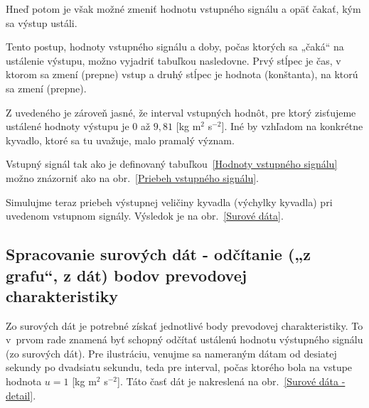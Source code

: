 \documentclass[a4paper, 10pt, ]{article}
\begin{document}
Hneď potom je však možné zmeniť hodnotu vstupného signálu a opäť čakať, kým sa výstup ustáli.

Tento postup, hodnoty vstupného signálu a doby, počas ktorých sa „čaká“ na ustálenie výstupu, možno vyjadriť tabuľkou nasledovne. Prvý stĺpec je čas, v ktorom sa zmení (prepne) vstup a druhý stĺpec je hodnota (konštanta), na ktorú sa zmení (prepne).


Z uvedeného je zároveň jasné, že interval vstupných hodnôt, pre ktorý zisťujeme ustálené hodnoty výstupu je $0$ až $9,81$ [kg m$^2$ s$^{-2}$]. Iné by vzhľadom na konkrétne kyvadlo, ktoré sa tu uvažuje, malo pramalý význam.

Vstupný signál tak ako je definovaný tabuľkou~\ref{Hodnoty vstupného signálu} možno znázorniť ako na obr.~\ref{Priebeh vstupného signálu}.





Simulujme teraz priebeh výstupnej veličiny kyvadla (výchylky kyvadla) pri uvedenom vstupnom signály. Výsledok je na obr.~\ref{Surové dáta}.
























\subsection[Spracovanie surových dát]{Spracovanie surových dát - odčítanie („z grafu“, z dát) bodov prevodovej charakteristiky}


Zo surových dát je potrebné získať jednotlivé body prevodovej charakteristiky. To v~prvom rade znamená byť schopný odčítať ustálenú hodnotu výstupného signálu (zo surových dát). Pre ilustráciu, venujme sa nameraným dátam od desiatej sekundy po dvadsiatu sekundu, teda pre interval, počas ktorého bola na vstupe hodnota $u=1$ [kg m$^2$ s$^{-2}$]. Táto časť dát je nakreslená na obr.~\ref{Surové dáta - detail}.
\end{document}
